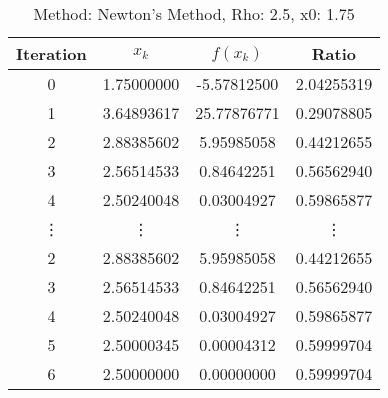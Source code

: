 \begin{table}
\centering
\caption{Method: Newton's Method, Rho: 2.5, x0: 1.75}
\label{tab:table_Newton's_Method_2_5_1_75}
\begin{tabular}{c c c c}
\toprule
Iteration &      $x_k$ &    $f(x_k)$ &      Ratio \\
\midrule
        0 & 1.75000000 & -5.57812500 & 2.04255319 \\
        1 & 3.64893617 & 25.77876771 & 0.29078805 \\
        2 & 2.88385602 &  5.95985058 & 0.44212655 \\
        3 & 2.56514533 &  0.84642251 & 0.56562940 \\
        4 & 2.50240048 &  0.03004927 & 0.59865877 \\
   \vdots &     \vdots &      \vdots &     \vdots \\
        2 & 2.88385602 &  5.95985058 & 0.44212655 \\
        3 & 2.56514533 &  0.84642251 & 0.56562940 \\
        4 & 2.50240048 &  0.03004927 & 0.59865877 \\
        5 & 2.50000345 &  0.00004312 & 0.59999704 \\
        6 & 2.50000000 &  0.00000000 & 0.59999704 \\
\bottomrule
\end{tabular}
\end{table}
